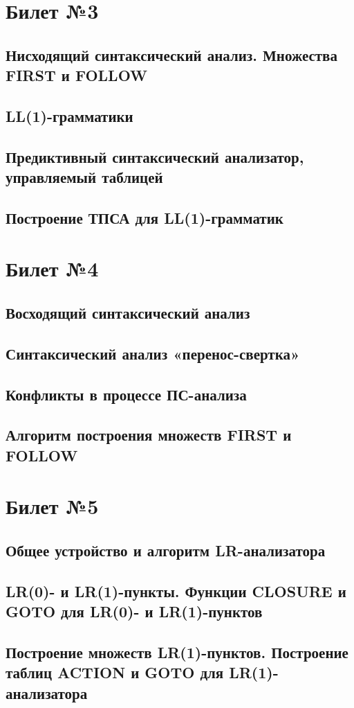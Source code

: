 \documentclass[a4paper]{article}
\theoremstyle{plain}
\theoremstyle{remark}
\theoremstyle{definition}
\begin{document}
\section{Билет №3}
\subsection{Нисходящий синтаксический анализ. Множества FIRST и FOLLOW}
\subsection{LL(1)-грамматики}
\subsection{Предиктивный синтаксический анализатор, управляемый таблицей}
\subsection{Построение ТПСА для LL(1)-грамматик}

\section{Билет №4}
\subsection{Восходящий синтаксический анализ}
\subsection{Синтаксический анализ «перенос-свертка»}
\subsection{Конфликты в процессе ПС-анализа}
\subsection{Алгоритм построения множеств FIRST и FOLLOW}

\section{Билет №5}
\subsection{Общее устройство и алгоритм LR-анализатора}
\subsection{LR(0)- и LR(1)-пункты. Функции CLOSURE и GOTO для LR(0)- и LR(1)-пунктов}
\subsection{Построение множеств LR(1)-пунктов. Построение таблиц ACTION и GOTO для LR(1)-анализатора}
\end{document}

